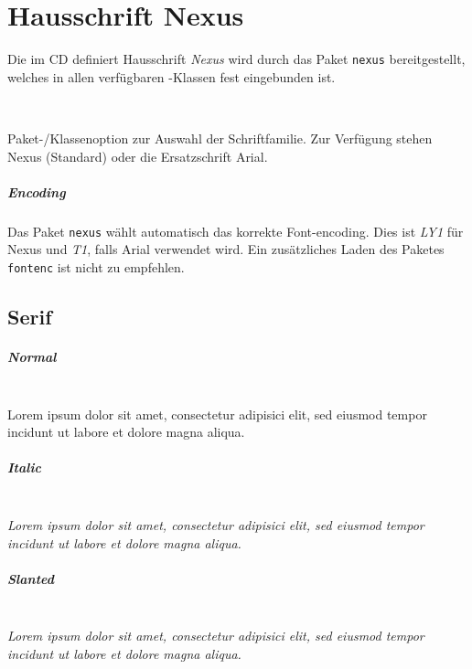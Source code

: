 \chapter{Hausschrift Nexus}\label{chap:nexus}

Die im CD definiert Hausschrift \emph{Nexus} wird durch das Paket
\texttt{nexus} bereitgestellt, welches in allen verfügbaren \tubslatex-Klassen
fest eingebunden ist.

\begin{Declaration}
  \\
\end{Declaration}

Paket-/Klassenoption zur Auswahl der Schriftfamilie.
Zur Verfügung stehen Nexus (Standard) oder die Ersatzschrift Arial.

\paragraph{Encoding}

Das Paket \texttt{nexus} wählt automatisch das korrekte Font-encoding.
Dies ist \emph{LY1} für Nexus und \emph{T1}, falls Arial verwendet wird.
Ein zusätzliches Laden des Paketes \texttt{fontenc} ist nicht zu empfehlen.

\section*{Serif}

\paragraph{Normal}\hfill\\
{
Lorem ipsum dolor sit amet, consectetur adipisici elit, sed eiusmod tempor
incidunt ut labore et dolore magna aliqua.}
\paragraph{Italic}\hfill\\
{\itshape
Lorem ipsum dolor sit amet, consectetur adipisici elit, sed eiusmod tempor
incidunt ut labore et dolore magna aliqua.}
\paragraph{Slanted}\hfill\\
{\slshape
Lorem ipsum dolor sit amet, consectetur adipisici elit, sed eiusmod tempor
incidunt ut labore et dolore magna aliqua.}
